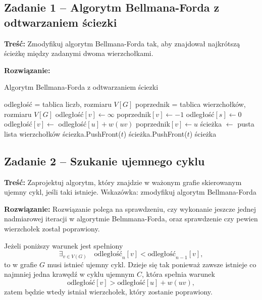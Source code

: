 \subsection{Zadanie 1 -- Algorytm Bellmana-Forda z odtwarzaniem ściezki}
\textbf{Treść: }Zmodyfikuj algorytm Bellmana-Forda tak, 
aby znajdował najkrótszą ścieżkę między zadanymi dwoma
wierzchołkami.

\textbf{Rozwiązanie: }

\begin{algorithm}[H]
	\caption{Algorytm Bellmana-Forda z odtwarzaniem ściezki}
	\begin{algorithmic}[1]

		\State odległość = tablica liczb, rozmiaru $V[G]$
		\State poprzednik = tablica wierzchołków, rozmiaru $V[G]$
		\State odległość$[v]\gets\infty$
		\State poprzednik$[v]\gets-1$
		\EndFor
		\State odległość$[s]\gets0$
		\State odległość$[v]\gets$ odległość$[u] + w(uv)$ 
		\State poprzednik$[v]\gets u$
		\EndIf
		\EndFor
		\EndFor
		\State ścieżka $\gets$ pusta lista wierzchołków
		\State ściezka.PushFront($t$)
		\State ścieżka.PushFront($t$)
		\EndWhile
		\State \Return ścieżka
		\EndProcedure
	\end{algorithmic}
	\label{Zadanie31}
\end{algorithm}
\subsection{Zadanie 2 -- Szukanie ujemnego cyklu}
\textbf{Treść: } Zaprojektuj algorytm, który znajdzie w 
ważonym grafie skierowanym ujemny cykl, jeśli taki istnieje.
Wskazówka: zmodyfikuj algorytm Bellmana-Forda

\textbf{Rozwiązanie: }
Rozwiązanie polega na sprawdzeniu, czy wykonanie
jeszcze jednej nadmiarowej iteracji 
w algorytmie Belmmana-Forda, oraz sprawdzenie
czy pewien wierzchołek został poprawiony.

Jeżeli poniższy warunek jest spełniony
\[\exists_{v\in V(G)}\quad \text{odległość}_n[v] < \text{odległość}_{n-1}[v],\]
to w grafie $G$ musi istnieć ujemny cykl. Dzieje się 
tak ponieważ zawsze istnieje co najmniej jedna krawędź 
w cyklu ujemnym $C$, która spełnia warunek 
\[\text{odległość}[v] > \text{odległość}[u] + w(uv),\]
zatem będzie wtedy istniał wierzchołek, który zostanie 
poprawiony.

